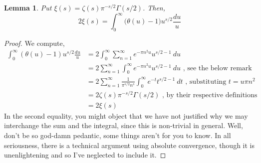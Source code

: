 \documentclass[12pt]{article}
\newtheorem{lemma}{Lemma}
\numberwithin{equation}{section}
\numberwithin{thm}{section}
\numberwithin{lemma}{section}
\numberwithin{cor}{section}
\begin{document}
\begin{lemma}\label{XiInTermsOfTheta}
  Put $\xi(s) = \zeta(s) \pi^{-s/2}\Gamma(s/2)$. Then, \begin{equation*}
    2 \xi(s) = \int_0^{\infty} \big( \theta(u) - 1 \big)u^{s/2} \frac{du}{u}
  \end{equation*}
\end{lemma}
\begin{proof}
  We compute, \begin{align*}
    \int_0^{\infty} (\theta(u) - 1)u^{s/2} \frac{du}{u} &= 2 \int_0^{\infty} \sum_{n = 1}^{\infty} e^{-\pi n^2 u} u^{s/2 - 1} \ du \\
    &= 2 \sum_{n = 1}^{\infty} \int_0^{\infty} e^{-\pi n^2 u} u^{s/2 - 1} \ du \text{ , see the below remark} \\
    &= 2 \sum_{n = 1}^{\infty} \frac{1}{\pi^{s/2} n^s} \int_0^{\infty}e^{-t} t^{s/2 - 1} \ dt \text{ , substituting } t = u \pi n^2 \\
    &= 2 \zeta(s) \pi^{-s/2} \Gamma(s/2) \text{ , by their respective definitions} \\
    &= 2 \xi(s)
  \end{align*} In the second equality, you might object that we have not justified why we may interchange the sum and the integral, since this is non-trivial in general. Well, don't be so god-damn pedantic, some things aren't for you to know. In all seriousness, there is a technical argument using absolute convergence, though it is unenlightening and so I've neglected to include it. 
\end{proof}
\end{document}
